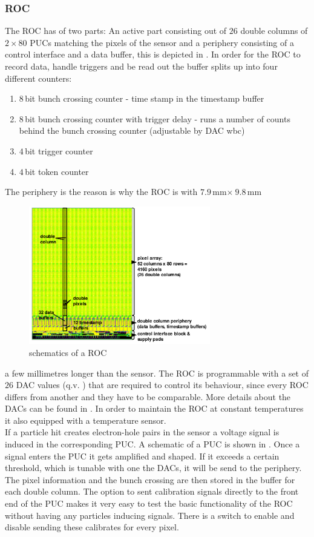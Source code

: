 \documentclass[british,11pt,a4paper]{memoir}
\begin{document}
\subsubsection{\ac{ROC}}\label{sroc}
The \ac{ROC} has of two parts: An active part consisting out of $26$ double columns of $2\times80$ \ac{PUC}s matching the pixels of the sensor and a periphery consisting of a control interface and a data buffer, this is depicted in . In order for the \ac{ROC} to record data, handle triggers and be read out the buffer splits up into four different counters:
\begin{enumerate}
	\item $8\,$bit bunch crossing counter - time stamp in the timestamp buffer
	\item $8\,$bit bunch crossing counter with trigger delay - runs a number of counts behind the bunch crossing counter (adjustable by \ac{DAC} wbc)
	\item $4\,$bit trigger counter
	\item $4\,$bit token counter
\end{enumerate}\par
The periphery is the reason is why the \ac{ROC} is with $7.9\,$mm$\times\ 9.8\,$mm 
\begin{figure}
	\includegraphics[width=7.9cm]{ROC_scheme}
	\caption{schematics of a \ac{ROC} \cite{psi46chip}}
	\label{p8}
\end{figure}  
a few millimetres longer than the sensor. The \ac{ROC} is programmable with a set of  $26$ \ac{DAC} values (q.v. ) that are required to control its behaviour, since every \ac{ROC} differs from another and they have to be comparable. More details about the \ac{DAC}s can be found in . In order to maintain the \ac{ROC} at constant temperatures it also equipped with a temperature sensor.\\
If a particle hit creates electron-hole pairs in the sensor a voltage signal is induced in the corresponding \ac{PUC}. A schematic of a \ac{PUC} is shown in . Once a signal enters the \ac{PUC} it gets amplified and shaped. If it exceeds a certain threshold, which is tunable with one the \ac{DAC}s, it will be send to the periphery. The pixel information and the bunch crossing are then stored in the buffer for each double column. The option to sent calibration signals directly to the front end of the \ac{PUC} makes it very easy to test the basic functionality of the \ac{ROC} without having any particles inducing signals. There is a switch to enable and disable sending these calibrates for every pixel.\\
\end{document}
